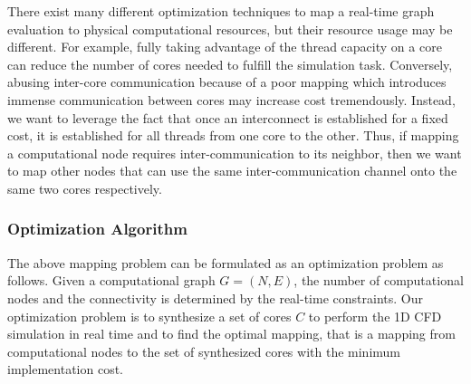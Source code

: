There exist many different optimization techniques to map a real-time graph evaluation to physical computational resources, but their resource usage may be different. 
For example, fully taking advantage of the thread capacity on a core can reduce the number of cores needed to fulfill the simulation task.
Conversely, abusing inter-core communication because of a poor mapping which introduces immense communication between cores may increase cost tremendously. 
Instead, we want to leverage the fact that once an interconnect is established for a fixed cost, it is established for all threads from one core to the other.
Thus, if mapping a computational node requires inter-communication to its neighbor, then we want to map other nodes that can use the same inter-communication channel onto the same two cores respectively.  
 
\subsubsection{Optimization Algorithm}
\label{sec:opt_alg}

The above mapping problem can be formulated as an optimization problem as follows. 
Given a computational graph $G=(N,E)$, the number of computational nodes and the connectivity is determined by the real-time constraints.
Our optimization problem is to synthesize a set of cores $C$ to perform the 1D CFD simulation in real time and to find the optimal mapping, that is a mapping from computational nodes to the set of synthesized cores with the minimum implementation cost.

